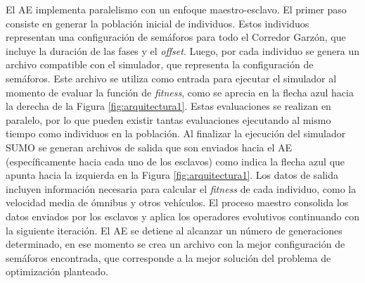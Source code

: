 El AE implementa paralelismo con un enfoque maestro-esclavo. El primer paso consiste en generar la población inicial de individuos. Estos individuos representan una configuración de semáforos para todo el Corredor Garzón, que incluye la duración de las fases y el \emph{offset}. Luego, por cada individuo se genera un archivo compatible con el simulador, que representa la configuración de semáforos. Este archivo se utiliza como entrada para ejecutar el simulador al momento de evaluar la función de \emph{fitness}, como se aprecia en la flecha azul hacia la derecha de la Figura \ref{fig:arquitectura1}. Estas evaluaciones se realizan en paralelo, por lo que pueden existir tantas evaluaciones ejecutando al mismo tiempo como individuos en la población. Al finalizar la ejecución del simulador SUMO se generan archivos de salida que son enviados hacia el AE (específicamente hacia cada uno de los esclavos) como indica la flecha azul que apunta hacia la izquierda en la Figura \ref{fig:arquitectura1}. Los datos de salida incluyen información necesaria para calcular el \emph{fitness} de cada individuo, como la velocidad media de ómnibus y otros vehículos. El proceso maestro consolida los datos enviados por los esclavos y aplica los operadores evolutivos continuando con la siguiente iteración. El AE se detiene al alcanzar un número de generaciones determinado, en ese momento se crea un archivo con la mejor configuración de semáforos encontrada, que corresponde a la mejor solución del problema de optimización planteado. 




